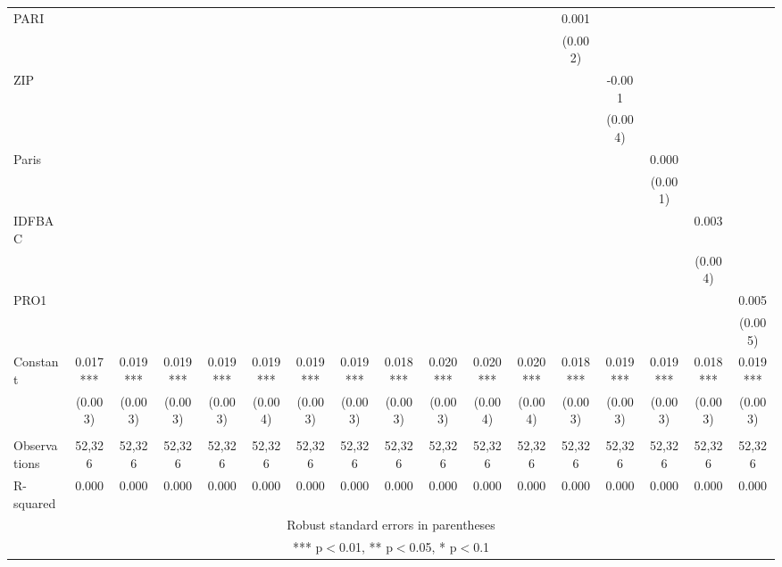 \documentclass[]{article}
\begin{document}
\begin{tabular}{lcccccccccccccccc}
PARI &  &  &  &  &  &  &  &  &  &  &  & 0.001 &  &  &  &  \\
 &  &  &  &  &  &  &  &  &  &  &  & (0.002) &  &  &  &  \\
ZIP &  &  &  &  &  &  &  &  &  &  &  &  & -0.001 &  &  &  \\
 &  &  &  &  &  &  &  &  &  &  &  &  & (0.004) &  &  &  \\
Paris &  &  &  &  &  &  &  &  &  &  &  &  &  & 0.000 &  &  \\
 &  &  &  &  &  &  &  &  &  &  &  &  &  & (0.001) &  &  \\
IDFBAC &  &  &  &  &  &  &  &  &  &  &  &  &  &  & 0.003 &  \\
 &  &  &  &  &  &  &  &  &  &  &  &  &  &  & (0.004) &  \\
PRO1 &  &  &  &  &  &  &  &  &  &  &  &  &  &  &  & 0.005 \\
 &  &  &  &  &  &  &  &  &  &  &  &  &  &  &  & (0.005) \\
Constant & 0.017*** & 0.019*** & 0.019*** & 0.019*** & 0.019*** & 0.019*** & 0.019*** & 0.018*** & 0.020*** & 0.020*** & 0.020*** & 0.018*** & 0.019*** & 0.019*** & 0.018*** & 0.019*** \\
 & (0.003) & (0.003) & (0.003) & (0.003) & (0.004) & (0.003) & (0.003) & (0.003) & (0.003) & (0.004) & (0.004) & (0.003) & (0.003) & (0.003) & (0.003) & (0.003) \\
 &  &  &  &  &  &  &  &  &  &  &  &  &  &  &  &  \\
Observations & 52,326 & 52,326 & 52,326 & 52,326 & 52,326 & 52,326 & 52,326 & 52,326 & 52,326 & 52,326 & 52,326 & 52,326 & 52,326 & 52,326 & 52,326 & 52,326 \\
 R-squared & 0.000 & 0.000 & 0.000 & 0.000 & 0.000 & 0.000 & 0.000 & 0.000 & 0.000 & 0.000 & 0.000 & 0.000 & 0.000 & 0.000 & 0.000 & 0.000 \\ \hline
\multicolumn{17}{c}{ Robust standard errors in parentheses} \\
\multicolumn{17}{c}{ *** p$<$0.01, ** p$<$0.05, * p$<$0.1} \\
\end{tabular}
\end{document}
